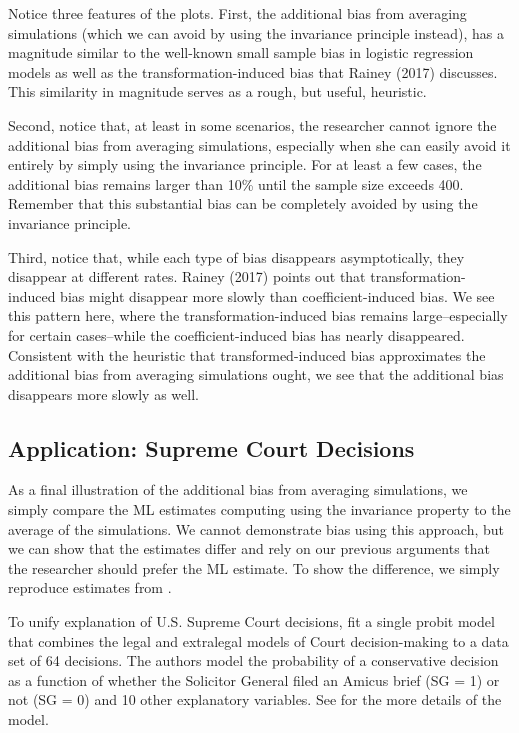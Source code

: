 \documentclass[11pt]{article}
\begin{document}
Notice three features of the plots. First, the additional bias from averaging simulations (which we can avoid by using the invariance principle instead), has a magnitude similar to the well-known small sample bias in logistic regression models as well as the transformation-induced bias that Rainey (2017) discusses.
This similarity in magnitude serves as a rough, but useful, heuristic.

Second, notice that, at least in some scenarios, the researcher cannot ignore the additional bias from averaging simulations, especially when she can easily avoid it entirely by simply using the invariance principle.
For at least a few cases, the additional bias remains larger than 10\% until the sample size exceeds 400. 
Remember that this substantial bias can be completely avoided by using the invariance principle.

Third, notice that, while each type of bias disappears asymptotically, they disappear at different rates. 
Rainey (2017) points out that transformation-induced bias might disappear more slowly than coefficient-induced bias. 
We see this pattern here, where the transformation-induced bias remains large--especially for certain cases--while the coefficient-induced bias has nearly disappeared.
Consistent with the heuristic that transformed-induced bias approximates the additional bias from averaging simulations ought, we see that the additional bias disappears more slowly as well.

\subsection*{Application: Supreme Court Decisions}

As a final illustration of the additional bias from averaging simulations, we simply compare the ML estimates computing using the invariance property to the average of the simulations. 
We cannot demonstrate bias using this approach, but we can show that the estimates differ and rely on our previous arguments that the researcher should prefer the ML estimate. 
To show the difference, we simply reproduce estimates from \cite{GeorgeEpstein1992}.

To unify explanation of U.S. Supreme Court decisions, \cite{GeorgeEpstein1992} fit a single probit model that combines the legal and extralegal models of Court decision-making to a data set of 64 decisions.
The authors model the probability of a conservative decision as a function of whether the Solicitor General filed an Amicus brief (SG = 1) or not (SG = 0) and 10 other explanatory variables.
See \cite{GeorgeEpstein1992} for the more details of the model.
\end{document}
